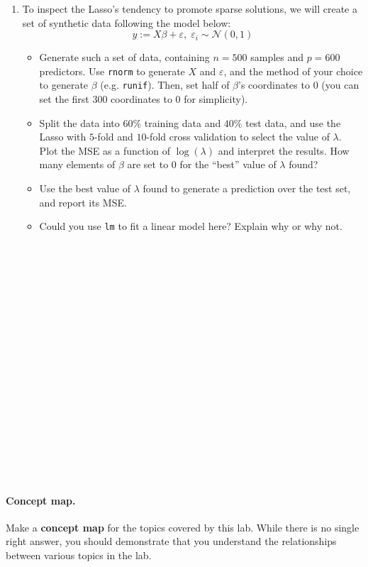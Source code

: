 \documentclass{article}
\begin{document}
\begin{enumerate}
\item To inspect the Lasso's tendency to promote sparse solutions, we will
create a set of synthetic data following the model below:
\begin{equation}
    y := X \beta + \varepsilon, \; \varepsilon_i \sim \mathcal{N}(0, 1)
\end{equation}
\begin{itemize}
\item Generate such a set of data, containing $n = 500$ samples and $p = 600$
predictors. Use \texttt{rnorm} to generate $X$ and $\varepsilon$, and the method
of your choice to generate $\beta$ (e.g. \texttt{runif}). Then, set half of
$\beta$'s coordinates to $0$ (you can set the first $300$ coordinates to $0$
for simplicity).
\item Split the data into $60\%$ training data
and $40\%$ test data, and use the Lasso with $5$-fold and $10$-fold cross
validation to select the value of $\lambda$. Plot the MSE as a function of
$\log(\lambda)$ and
interpret the results. How many elements of $\beta$ are set to $0$ for the
``best'' value of $\lambda$ found?
\item Use the best value of $\lambda$ found to generate a prediction over the
test set, and report its MSE.
\item Could you use \texttt{lm} to fit a linear model here? Explain why or why
not.
\end{itemize}


\begin{Verbatim}[frame=single]





















\end{Verbatim}
\end{enumerate}

\paragraph{Concept map.} Make a \textbf{concept map} for the topics covered by
this lab. While there is no single right answer, you should demonstrate that you
understand the relationships between various topics in the lab.
\end{document}
